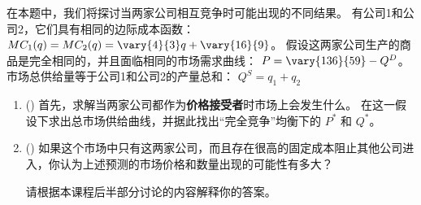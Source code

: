 \begin{question}[type=exam]{30}
  在本题中，我们将探讨当两家公司相互竞争时可能出现的不同结果。
  有公司1和公司2，它们具有相同的边际成本函数：
  $MC_1(q)=MC_2(q)=\vary{4}{3}q + \vary{16}{9}$。
  假设这两家公司生产的商品是完全相同的，并且面临相同的市场需求曲线：
  $P=\vary{136}{59} - Q^D$。
  市场总供给量等于公司1和公司2的产量总和：
  $Q^S = q_1+q_2$

  \begin{enumerate}[label=(\alph*)]

    \item ()
    首先，求解当两家公司都作为\textbf{价格接受者}时市场上会发生什么。
    在这一假设下求出总市场供给曲线，并据此找出“完全竞争”均衡下的 $P^*$ 和 $Q^*$。

    
    \item ()
    如果这个市场中只有这两家公司，而且存在很高的固定成本阻止其他公司进入，你认为上述预测的市场价格和数量出现的可能性有多大？

    请根据本课程后半部分讨论的内容解释你的答案。


\end{enumerate}
\end{question}
